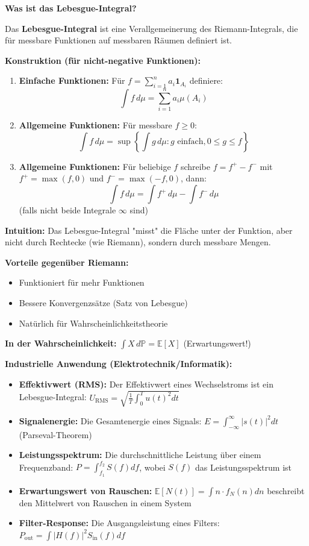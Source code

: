 \begin{denoobification}
\textbf{Was ist das Lebesgue-Integral?}

Das \textbf{Lebesgue-Integral} ist eine Verallgemeinerung des Riemann-Integrals, die für messbare Funktionen auf messbaren Räumen definiert ist.

\textbf{Konstruktion (für nicht-negative Funktionen):}
\begin{enumerate}
    \item \textbf{Einfache Funktionen:} Für $f = \sum_{i=1}^{n} a_i \mathbf{1}_{A_i}$ definiere:
    \[
    \int f \, d\mu = \sum_{i=1}^{n} a_i \mu(A_i)
    \]
    \item \textbf{Allgemeine Funktionen:} Für messbare $f \geq 0$:
    \[
    \int f \, d\mu = \sup\left\{\int g \, d\mu : g \text{ einfach}, 0 \leq g \leq f\right\}
    \]
    \item \textbf{Allgemeine Funktionen:} Für beliebige $f$ schreibe $f = f^+ - f^-$ mit $f^+ = \max(f, 0)$ und $f^- = \max(-f, 0)$, dann:
    \[
    \int f \, d\mu = \int f^+ \, d\mu - \int f^- \, d\mu
    \]
    (falls nicht beide Integrale $\infty$ sind)
\end{enumerate}

\textbf{Intuition:} Das Lebesgue-Integral "misst" die Fläche unter der Funktion, aber nicht durch Rechtecke (wie Riemann), sondern durch messbare Mengen.

\textbf{Vorteile gegenüber Riemann:}
\begin{itemize}
    \item Funktioniert für mehr Funktionen
    \item Bessere Konvergenzsätze (Satz von Lebesgue)
    \item Natürlich für Wahrscheinlichkeitstheorie
\end{itemize}

\textbf{In der Wahrscheinlichkeit:} $\int X \, d\mathbb{P} = \mathbb{E}[X]$ (Erwartungswert!)

\textbf{Industrielle Anwendung (Elektrotechnik/Informatik):}
\begin{itemize}
    \item \textbf{Effektivwert (RMS):} Der Effektivwert eines Wechselstroms ist ein Lebesgue-Integral: $U_{\text{RMS}} = \sqrt{\frac{1}{T}\int_0^T u(t)^2 dt}$
    \item \textbf{Signalenergie:} Die Gesamtenergie eines Signals: $E = \int_{-\infty}^{\infty} |s(t)|^2 dt$ (Parseval-Theorem)
    \item \textbf{Leistungsspektrum:} Die durchschnittliche Leistung über einem Frequenzband: $P = \int_{f_1}^{f_2} S(f) df$, wobei $S(f)$ das Leistungsspektrum ist
    \item \textbf{Erwartungswert von Rauschen:} $\mathbb{E}[N(t)] = \int n \cdot f_N(n) dn$ beschreibt den Mittelwert von Rauschen in einem System
    \item \textbf{Filter-Response:} Die Ausgangsleistung eines Filters: $P_{\text{out}} = \int |H(f)|^2 S_{\text{in}}(f) df$
\end{itemize}


\end{denoobification}
